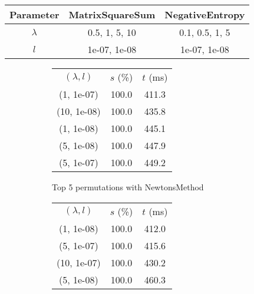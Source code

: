 \begin{center}
\label{tab:params_NewtonsSearch}
\begin{tabular}{|c|c|c|}
\hline
\rowcolor{gray!25}
Parameter & MatrixSquareSum & NegativeEntropy \\
\hline
$\lambda$ & 0.5, 1, 5, 10 & 0.1, 0.5, 1, 5 \\
$l$ & 1e-07, 1e-08 & 1e-07, 1e-08 \\
\hline
\end{tabular}
\end{center}

\begin{figure}[H]
\label{fig:param_comp_MatrixSquareSum_NewtonsSearch}
\begin{subfigure}[ht]{.5\textwidth}
\begin{tabular}{|c|c|c|}
\hline
\rowcolor{gray!25}
\multicolumn{3}{|c|}{NewtonsMethod} \\
\hline
\rowcolor{gray!25}
$(\lambda,l)$ & $s$ (\%) & $t$ (ms) \\
\hline
(1, 1e-07) & 100.0 & 411.3 \\
(10, 1e-08) & 100.0 & 435.8 \\
(1, 1e-08) & 100.0 & 445.1 \\
(5, 1e-08) & 100.0 & 447.9 \\
(5, 1e-07) & 100.0 & 449.2 \\
\hline
\end{tabular}
\caption{Top 5 permutations with NewtonsMethod}
\label{subfig:param_comp_MatrixSquareSum_NewtonsMethod_NewtonsSearch}
\end{subfigure}
\hfill
\begin{subfigure}[ht]{.5\textwidth}
\begin{tabular}{|c|c|c|}
\hline
\rowcolor{gray!25}
\multicolumn{3}{|c|}{GradientDescentMethod} \\
\hline
\rowcolor{gray!25}
$(\lambda,l)$ & $s$ (\%) & $t$ (ms) \\
\hline
(1, 1e-08) & 100.0 & 412.0 \\
(5, 1e-07) & 100.0 & 415.6 \\
(10, 1e-07) & 100.0 & 430.2 \\
(5, 1e-08) & 100.0 & 460.3 \\

\end{tabular}
\end{subfigure}
\end{figure}

